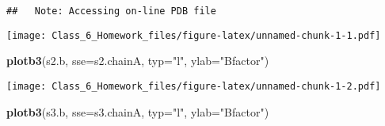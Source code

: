\documentclass[]{article}
\newenvironment{Shaded}{\begin{snugshade}}{\end{snugshade}}
\newcommand{\KeywordTok}[1]{\textcolor[rgb]{0.13,0.29,0.53}{\textbf{#1}}}
\newcommand{\DataTypeTok}[1]{\textcolor[rgb]{0.13,0.29,0.53}{#1}}
\newcommand{\StringTok}[1]{\textcolor[rgb]{0.31,0.60,0.02}{#1}}
\newcommand{\CommentTok}[1]{\textcolor[rgb]{0.56,0.35,0.01}{\textit{#1}}}
\newcommand{\OperatorTok}[1]{\textcolor[rgb]{0.81,0.36,0.00}{\textbf{#1}}}
\newcommand{\NormalTok}[1]{#1}
\begin{document}
\begin{verbatim}
##   Note: Accessing on-line PDB file
\end{verbatim}

\begin{Shaded}
\end{Shaded}

\texttt{[image: Class\_6\_Homework\_files/figure-latex/unnamed-chunk-1-1.pdf]}

\begin{Shaded}
\begin{Highlighting}[]
\KeywordTok{plotb3}\NormalTok{(s2.b, }\DataTypeTok{sse=}\NormalTok{s2.chainA, }\DataTypeTok{typ=}\StringTok{"l"}\NormalTok{, }\DataTypeTok{ylab=}\StringTok{"Bfactor"}\NormalTok{)}
\end{Highlighting}
\end{Shaded}

\texttt{[image: Class\_6\_Homework\_files/figure-latex/unnamed-chunk-1-2.pdf]}

\begin{Shaded}
\begin{Highlighting}[]
\KeywordTok{plotb3}\NormalTok{(s3.b, }\DataTypeTok{sse=}\NormalTok{s3.chainA, }\DataTypeTok{typ=}\StringTok{"l"}\NormalTok{, }\DataTypeTok{ylab=}\StringTok{"Bfactor"}\NormalTok{)}
\end{Highlighting}
\end{Shaded}
\end{document}
